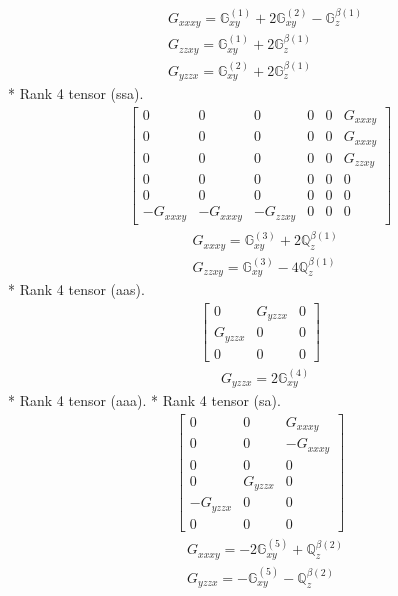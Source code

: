 \documentclass[fleqn,8pt,landscape]{jsarticle}
\begin{document}
\begin{align*}
& G_{xxxy} = \mathbb{G}_{xy}^{(1)} + 2 \mathbb{G}_{xy}^{(2)} - \mathbb{G}_{z}^{\beta(1)} \\
& G_{zzxy} = \mathbb{G}_{xy}^{(1)} + 2 \mathbb{G}_{z}^{\beta(1)} \\
& G_{yzzx} = \mathbb{G}_{xy}^{(2)} + 2 \mathbb{G}_{z}^{\beta(1)}
\end{align*}
* Rank 4 tensor (ssa).
\begin{align*}
\begin{bmatrix} 0 & 0 & 0 & 0 & 0 & G_{xxxy} \\ 0 & 0 & 0 & 0 & 0 & G_{xxxy} \\ 0 & 0 & 0 & 0 & 0 & G_{zzxy} \\ 0 & 0 & 0 & 0 & 0 & 0 \\ 0 & 0 & 0 & 0 & 0 & 0 \\ - G_{xxxy} & - G_{xxxy} & - G_{zzxy} & 0 & 0 & 0 \end{bmatrix}
\end{align*}
\begin{align*}
& G_{xxxy} = \mathbb{G}_{xy}^{(3)} + 2 \mathbb{Q}_{z}^{\beta(1)} \\
& G_{zzxy} = \mathbb{G}_{xy}^{(3)} - 4 \mathbb{Q}_{z}^{\beta(1)}
\end{align*}
* Rank 4 tensor (aas).
\begin{align*}
\begin{bmatrix} 0 & G_{yzzx} & 0 \\ G_{yzzx} & 0 & 0 \\ 0 & 0 & 0 \end{bmatrix}
\end{align*}
\begin{align*}
& G_{yzzx} = 2 \mathbb{G}_{xy}^{(4)}
\end{align*}
* Rank 4 tensor (aaa).
* Rank 4 tensor (sa).
\begin{align*}
\begin{bmatrix} 0 & 0 & G_{xxxy} \\ 0 & 0 & - G_{xxxy} \\ 0 & 0 & 0 \\ 0 & G_{yzzx} & 0 \\ - G_{yzzx} & 0 & 0 \\ 0 & 0 & 0 \end{bmatrix}
\end{align*}
\begin{align*}
& G_{xxxy} = - 2 \mathbb{G}_{xy}^{(5)} + \mathbb{Q}_{z}^{\beta(2)} \\
& G_{yzzx} = - \mathbb{G}_{xy}^{(5)} - \mathbb{Q}_{z}^{\beta(2)}
\end{align*}
\end{document}
